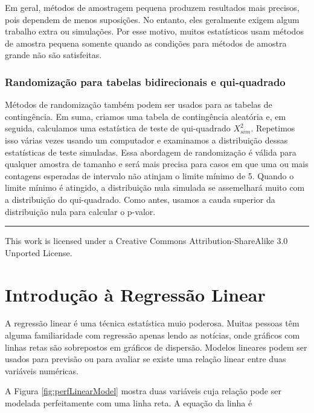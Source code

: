 \documentclass[
]{book}
\theoremstyle{definition}
\theoremstyle{definition}
\theoremstyle{definition}
\theoremstyle{definition}
\theoremstyle{remark}
\begin{document}
Em geral, métodos de amostragem pequena produzem resultados mais precisos, pois dependem de menos suposições. No entanto, eles geralmente exigem algum trabalho extra ou simulações. Por esse motivo, muitos estatísticos usam métodos de amostra pequena somente quando as condições para métodos de amostra grande não são satisfeitas.

\hypertarget{randomizationBidirectionalChiSquareTables}{%
\subsection{Randomização para tabelas bidirecionais e qui-quadrado}\label{randomizationBidirectionalChiSquareTables}}

Métodos de randomização também podem ser usados para as tabelas de contingência. Em suma, criamos uma tabela de contingência aleatória e, em seguida, calculamos uma estatística de teste de qui-quadrado \(X_ {sim}^2\). Repetimos isso várias vezes usando um computador e examinamos a distribuição dessas estatísticas de teste simuladas. Essa abordagem de randomização é válida para qualquer amostra de tamanho e será mais precisa para casos em que uma ou mais contagens esperadas de intervalo não atinjam o limite mínimo de 5. Quando o limite mínimo é atingido, a distribuição nula simulada se assemelhará muito com a distribuição do qui-quadrado. Como antes, usamos a cauda superior da distribuição nula para calcular o p-valor.

\begin{center}\rule{0.5\linewidth}{0.5pt}\end{center}

This work is licensed under a Creative Commons Attribution-ShareAlike 3.0 Unported License.

\hypertarget{ch7-reg-simples}{%
\chapter{Introdução à Regressão Linear}\label{ch7-reg-simples}}

A regressão linear é uma técnica estatística muio poderosa. Muitas pessoas têm alguma familiaridade com regressão apenas lendo as notícias, onde gráficos com linhas retas são sobrepostos em gráficos de dispersão. Modelos lineares podem ser usados para previsão ou para avaliar se existe uma relação linear entre duas variáveis numéricas.

A Figura \ref{fig:perfLinearModel} mostra duas variáveis cuja relação pode ser modelada perfeitamente com uma linha reta. A equação da linha é
\end{document}
